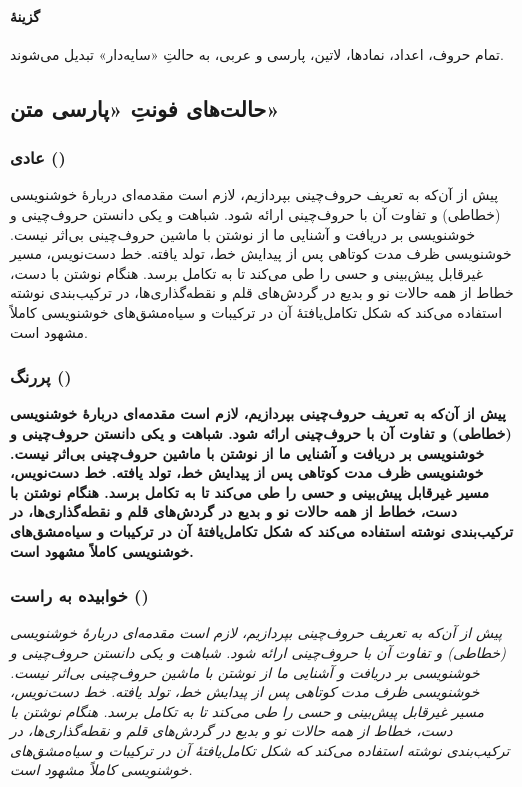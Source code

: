 \documentclass[10pt,a5paper]{article}
\theoremstyle{definition}
\theoremstyle{plain}
\begin{document}
\paragraph*{گزینۀ }
تمام حروف، اعداد، نمادها، لاتین، پارسی و عربی، به حالتِ «سایه‌دار» تبدیل می‌شوند.


\subsection{حالت‌های فونتِ «پارسی متن»}

\subsubsection{عادی ()}

پیش از آن‌که به تعریف حروف‌چینی بپردازیم، لازم است مقدمه‌ای دربارۀ خوشنویسی (خطاطی) و تفاوت آن با حروف‌چینی ارائه شود. شباهت و یکی دانستن حروف‌چینی و خوشنویسی بر دریافت و آشنایی ما از نوشتن با ماشین حروف‌چینی بی‌اثر نیست. خوشنویسی ظرف مدت کوتاهی پس از پیدایش خط، تولد یافته. خط دست‌نویس، مسیر غیرقابل پیش‌بینی و حسی را طی می‌کند تا به تکامل برسد. هنگام نوشتن با دست، خطاط از همه حالات نو و بدیع در گردش‌های قلم و نقطه‌گذاری‌ها، در ترکیب‌بندی نوشته استفاده می‌کند که شکل تکامل‌یافتۀ آن در ترکیبات و سیاه‌مشق‌های خوشنویسی کاملاً مشهود است.

\subsubsection{پررنگ ()}
{\bfseries
پیش از آن‌که به تعریف حروف‌چینی بپردازیم، لازم است مقدمه‌ای دربارۀ خوشنویسی (خطاطی) و تفاوت آن با حروف‌چینی ارائه شود. شباهت و یکی دانستن حروف‌چینی و خوشنویسی بر دریافت و آشنایی ما از نوشتن با ماشین حروف‌چینی بی‌اثر نیست. خوشنویسی ظرف مدت کوتاهی پس از پیدایش خط، تولد یافته. خط دست‌نویس، مسیر غیرقابل پیش‌بینی و حسی را طی می‌کند تا به تکامل برسد. هنگام نوشتن با دست، خطاط از همه حالات نو و بدیع در گردش‌های قلم و نقطه‌گذاری‌ها، در ترکیب‌بندی نوشته استفاده می‌کند که شکل تکامل‌یافتۀ آن در ترکیبات و سیاه‌مشق‌های خوشنویسی کاملاً مشهود است.
}

\subsubsection{خوابیده به راست ()}
{\itshape
پیش از آن‌که به تعریف حروف‌چینی بپردازیم، لازم است مقدمه‌ای دربارۀ خوشنویسی (خطاطی) و تفاوت آن با حروف‌چینی ارائه شود. شباهت و یکی دانستن حروف‌چینی و خوشنویسی بر دریافت و آشنایی ما از نوشتن با ماشین حروف‌چینی بی‌اثر نیست. خوشنویسی ظرف مدت کوتاهی پس از پیدایش خط، تولد یافته. خط دست‌نویس، مسیر غیرقابل پیش‌بینی و حسی را طی می‌کند تا به تکامل برسد. هنگام نوشتن با دست، خطاط از همه حالات نو و بدیع در گردش‌های قلم و نقطه‌گذاری‌ها، در ترکیب‌بندی نوشته استفاده می‌کند که شکل تکامل‌یافتۀ آن در ترکیبات و سیاه‌مشق‌های خوشنویسی کاملاً مشهود است.
}
\end{document}
